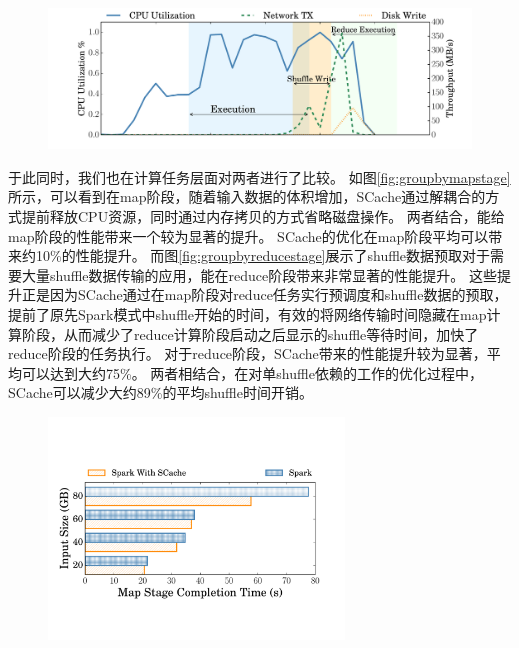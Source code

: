 \begin{figure}[!htp]
	\centering
	\includegraphics[width=\textwidth]{../../PPoPP-2018/fig/scache_util.pdf}
\end{figure}

于此同时，我们也在计算任务层面对两者进行了比较。
如图\ref{fig:groupbymapstage}所示，可以看到在map阶段，随着输入数据的体积增加，SCache通过解耦合的方式提前释放CPU资源，同时通过内存拷贝的方式省略磁盘操作。
两者结合，能给map阶段的性能带来一个较为显著的提升。
SCache的优化在map阶段平均可以带来约10\%的性能提升。
而图\ref{fig:groupbyreducestage}展示了shuffle数据预取对于需要大量shuffle数据传输的应用，能在reduce阶段带来非常显著的性能提升。
这些提升正是因为SCache通过在map阶段对reduce任务实行预调度和shuffle数据的预取，提前了原先Spark模式中shuffle开始的时间，有效的将网络传输时间隐藏在map计算阶段，从而减少了reduce计算阶段启动之后显示的shuffle等待时间，加快了reduce阶段的任务执行。
对于reduce阶段，SCache带来的性能提升较为显著，平均可以达到大约75\%。
两者相结合，在对单shuffle依赖的工作的优化过程中，SCache可以减少大约89\%的平均shuffle时间开销。

\begin{figure}[!htp]
	\centering
	\includegraphics[width=0.7\textwidth]{../../PPoPP-2018/fig/groupbymapstage.pdf}
\end{figure}

